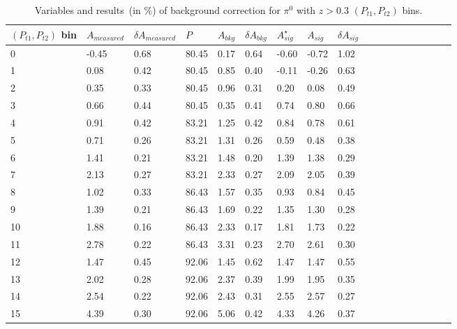 \begin{table}[H]\footnotesize
\centering
\begin{tabular}{|l|l|l|l|l|l|l|l|l|l|l|l|l|l|l|l|l|l|}
\\ \hline
$(P_{t1},P_{t2})$ bin & $A_{measured}$ & $\delta A_{measured}$ & $P$  & $A_{bkg}$ & $\delta A_{bkg}$ & $A_{sig}^{\star}$ & $ A_{sig}$  & $\delta A_{sig}$ \\ \hline
0 & -0.45 & 0.68 & 80.45 & 0.17 & 0.64 & -0.60 & -0.72 & 1.02 \\ \hline 
1 & 0.08 & 0.42 & 80.45 & 0.85 & 0.40 & -0.11 & -0.26 & 0.63 \\ \hline 
2 & 0.35 & 0.33 & 80.45 & 0.96 & 0.31 & 0.20 & 0.08 & 0.49 \\ \hline 
3 & 0.66 & 0.44 & 80.45 & 0.35 & 0.41 & 0.74 & 0.80 & 0.66 \\ \hline 
4 & 0.91 & 0.42 & 83.21 & 1.25 & 0.42 & 0.84 & 0.78 & 0.61 \\ \hline 
5 & 0.71 & 0.26 & 83.21 & 1.31 & 0.26 & 0.59 & 0.48 & 0.38 \\ \hline 
6 & 1.41 & 0.21 & 83.21 & 1.48 & 0.20 & 1.39 & 1.38 & 0.29 \\ \hline 
7 & 2.13 & 0.27 & 83.21 & 2.33 & 0.27 & 2.09 & 2.05 & 0.39 \\ \hline 
8 & 1.02 & 0.33 & 86.43 & 1.57 & 0.35 & 0.93 & 0.84 & 0.45 \\ \hline 
9 & 1.39 & 0.21 & 86.43 & 1.69 & 0.22 & 1.35 & 1.30 & 0.28 \\ \hline 
10 & 1.88 & 0.16 & 86.43 & 2.33 & 0.17 & 1.81 & 1.73 & 0.22 \\ \hline 
11 & 2.78 & 0.22 & 86.43 & 3.31 & 0.23 & 2.70 & 2.61 & 0.30 \\ \hline 
12 & 1.47 & 0.45 & 92.06 & 1.45 & 0.62 & 1.47 & 1.47 & 0.55 \\ \hline 
13 & 2.02 & 0.28 & 92.06 & 2.37 & 0.39 & 1.99 & 1.95 & 0.35 \\ \hline 
14 & 2.54 & 0.22 & 92.06 & 2.43 & 0.31 & 2.55 & 2.57 & 0.27 \\ \hline 
15 & 4.39 & 0.30 & 92.06 & 5.06 & 0.42 & 4.33 & 4.26 & 0.37 \\ \hline 
\end{tabular}
\caption{Variables and results~(in $\%$) of background correction for $\pi^0$ with $z>0.3$ $(P_{t1},P_{t2})$ bins. }
\label{tab:pi0comptbkgcor}
\end{table} 

